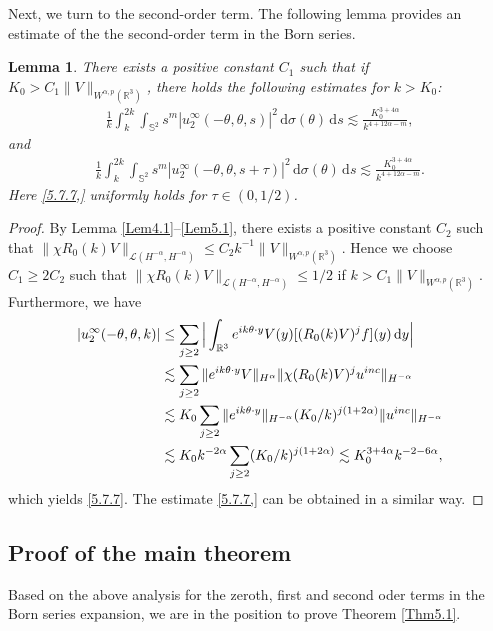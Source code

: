 \documentclass[reqno, 12pt]{amsart}
\newtheorem{Le}{Lemma}[section]
\numberwithin{equation}{section}
\begin{document}
Next, we turn to the second-order term. The following lemma provides an estimate of the the second-order term in the Born series.
\begin{Le}\label{highorder} There exists a positive constant $C_1$ such that if $K_0>C_1\|V\|_{W^{\alpha,p}(\mathbb R^3)}$, there holds the following estimates for $k>K_0$:
\begin{align}\label{5.7.7}
	\frac{1}{k}\int_k^{2k}\int_{\mathbb S^2}s^m|u^\infty_2(-\theta,\theta,s)|^2\,\mathrm{d}\sigma(\theta)\,\mathrm{d}s \lesssim \frac{K_0^{3+4\alpha}}{k^{4+12\alpha-m}},
\end{align} and \begin{align}\label{5.7.7,}
	\frac{1}{k}\int_k^{2k}\int_{\mathbb S^2}s^m|u^\infty_2(-\theta,\theta,s+\tau)|^2\,\mathrm{d}\sigma(\theta)\,\mathrm{d}s \lesssim \frac{K_0^{3+4\alpha}}{k^{4+12\alpha-m}}.
\end{align} Here \eqref{5.7.7,} uniformly holds for $\tau \in (0,1/2)$.
\end{Le}
\begin{proof} By Lemma \ref{Lem4.1}--\ref{Lem5.1}, there exists a positive constant $C_2$ such that $\|\chi R_0(k)V\|_{\mathcal L(H^{-\alpha},H^{-\alpha})} \le C_2k^{-1}\|V\|_{W^{\alpha,p}(\mathbb R^3)}$. Hence we choose $C_1 \ge 2C_2$ such that $\|\chi R_0(k)V\|_{\mathcal L(H^{-\alpha},H^{-\alpha})} \le 1/2$ if $k>C_1\|V\|_{W^{\alpha,p}(\mathbb R^3)}$. Furthermore, we have 
\begin{align}
	|u_2^\infty(-\theta,\theta,k)| &\le \sum_{j \ge 2} \Big| \int_{\mathbb{R}^3}e^{ik \theta \cdot  y}V(y) [( R_0(k)V)^jf](y)\,\mathrm{d}y\Big| \notag \\ &\lesssim  \sum_{j \ge 2} \|e^{ik\theta \cdot y}V\|_{H^{\alpha}} \| \chi (R_0(k) V)^j u^{inc}\|_{H^{-\alpha}} \notag \\ &\lesssim K_0\sum_{j \ge 2} \|e^{ik\theta \cdot y}\|_{H^{-\alpha}} (K_0/k)^{j(1+2\alpha)}\|u^{inc}\|_{H^{-\alpha}} \notag \\ & \lesssim K_0k^{-2\alpha}\sum_{j \ge 2} (K_0/k)^{j(1+2\alpha)} \lesssim K_0^{3+4\alpha}k^{-2-6\alpha},\label{5.8}
\end{align} which yields \eqref{5.7.7}. The estimate \eqref{5.7.7,} can be obtained in a similar way.
\end{proof} 

\subsection{Proof of the main theorem}
Based on the above analysis for the zeroth, first and second oder terms in the Born series expansion, 
we are in the position to prove Theorem \ref{Thm5.1}.
\end{document}
